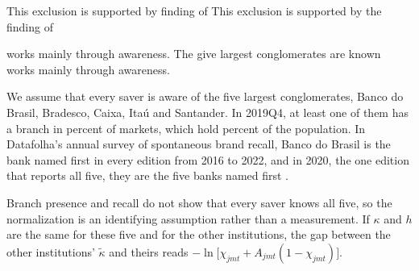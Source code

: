 This exclusion is supported by  finding of
This exclusion is supported by the finding of

works mainly through awareness. %
The give largest conglomerates are known
works mainly through awareness.

We assume that every saver is aware of the five largest conglomerates, Banco do Brasil, Bradesco, Caixa, Ita\'{u} and Santander. In 2019Q4, at least one of them has a branch in  percent of markets, which hold  percent of the population. In Datafolha's annual survey of spontaneous brand recall, Banco do Brasil is the bank named first in every edition from 2016 to 2022, and in 2020, the one edition that reports all five, they are the five banks named first \parencite{datafolha_topofmind}.

Branch presence and recall do not show that every saver knows all five, so the normalization is an identifying assumption rather than a measurement. If $\kappa$ and $h$ are the same for these five and for the other institutions, the gap between the other institutions' $\tilde{\kappa}$ and theirs reads $-\ln\bigl[\chi_{jmt}+A_{jmt}(1-\chi_{jmt})\bigr]$.


